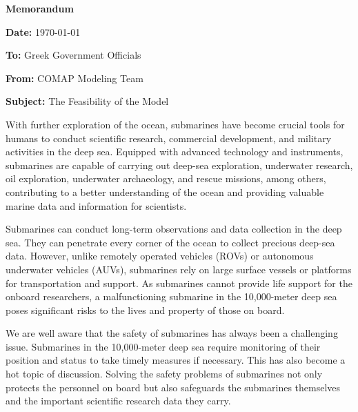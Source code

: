 \documentclass[12pt]{article}
\begin{document}



\newpage

\pagestyle{empty}


\begin{center}
    \Huge\textbf{Memorandum}
\end{center}

\textbf{Date:} \today

\textbf{To:} Greek Government Officials

\textbf{From:} COMAP Modeling Team

\textbf{Subject:} The Feasibility of the Model

\hfill

With further exploration of the ocean, submarines have become crucial tools for humans to conduct scientific research, commercial development, and military activities in the deep sea. Equipped with advanced technology and instruments, submarines are capable of carrying out deep-sea exploration, underwater research, oil exploration, underwater archaeology, and rescue missions, among others, contributing to a better understanding of the ocean and providing valuable marine data and information for scientists.

Submarines can conduct long-term observations and data collection in the deep sea. They can penetrate every corner of the ocean to collect precious deep-sea data. However, unlike remotely operated vehicles (ROVs) or autonomous underwater vehicles (AUVs), submarines rely on large surface vessels or platforms for transportation and support. As submarines cannot provide life support for the onboard researchers, a malfunctioning submarine in the 10,000-meter deep sea poses significant risks to the lives and property of those on board.

We are well aware that the safety of submarines has always been a challenging issue. Submarines in the 10,000-meter deep sea require monitoring of their position and status to take timely measures if necessary. This has also become a hot topic of discussion. Solving the safety problems of submarines not only protects the personnel on board but also safeguards the submarines themselves and the important scientific research data they carry.
\end{document}
